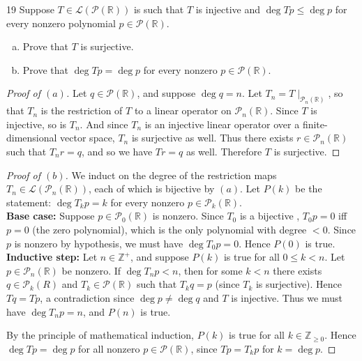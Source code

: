 \documentclass{extarticle}
\newenvironment{problem}[1]{\begin{prob*}{#1}{}}{\end{prob*}}
\newcommand{\Z}{\mathbb{Z}}
\newcommand{\R}{\mathbb{R}}
\newcommand{\poly}{\mathcal{P}}
\newcommand{\Hom}{\mathcal{L}}
\begin{document}
\begin{problem}{19}
Suppose $T\in\Hom(\poly(\R))$ is such that $T$ is injective and $\deg Tp\leq \deg p$ for every nonzero polynomial $p\in\poly(\R)$.
\begin{enumerate}[(a)]
\item Prove that $T$ is surjective.
\item Prove that $\deg Tp = \deg p$ for every nonzero $p\in\poly(\R)$.  
\end{enumerate}
\end{problem}
\begin{proof}[Proof of $(a)$]
Let $q\in\poly(\R)$, and suppose $\deg q = n$.  Let $T_n = T\mid_{\poly_n(\R)}$, so that $T_n$ is the restriction of $T$ to a linear operator on $\poly_n(\R)$.  Since $T$ is injective, so is $T_n$.  And since $T_n$ is an injective linear operator over a finite-dimensional vector space, $T_n$ is surjective as well.  Thus there exists $r\in\poly_n(\R)$ such that $T_nr = q$, and so we have $Tr = q$ as well.  Therefore $T$ is surjective.
\end{proof}
\begin{proof}[Proof of $(b)$]
We induct on the degree of the restriction maps $T_n\in\Hom(\poly_n(\R))$, each of which is bijective by $(a)$.  Let $P(k)$ be the statement: $\deg T_k p = k$ for every nonzero $p\in\poly_k(\R)$.\\
\textbf{Base case:} Suppose $p\in\poly_0(\R)$ is nonzero.  Since $T_0$ is a bijective , $T_0p = 0$ iff $p = 0$ (the zero polynomial), which is the only polynomial with degree $< 0$.  Since $p$ is nonzero by hypothesis, we must have $\deg T_0p = 0$.  Hence $P(0)$ is true.\\
\textbf{Inductive step:} Let $n\in\Z^+$, and suppose $P(k)$ is true for all $0\leq k < n$.  Let $p\in\poly_{n}(\R)$ be nonzero.  If $\deg T_{n}p < n$, then for some $k < n$ there exists $q\in\poly_k(R)$ and $T_k\in\poly(\R)$ such that $T_kq = p$ (since $T_k$ is surjective).  Hence $Tq = Tp$, a contradiction since $\deg p\neq \deg q$ and $T$ is injective.  Thus we must have $\deg T_{n}p = n$, and $P(n)$ is true.
\par By the principle of mathematical induction, $P(k)$ is true for all $k\in\Z_{\geq 0}$.  Hence $\deg Tp = \deg p$ for all nonzero $p\in\poly(\R)$, since $Tp = T_k p$ for $k = \deg p$.
\end{proof}

\end{document}
